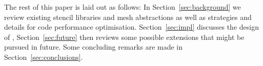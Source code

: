 The rest of this paper is laid out as follows:
In Section~\ref{sec:background} we review existing stencil libraries and mesh abstractions as well as strategies and details for code performance optimisation.
Section~\ref{sec:impl} discusses the design of , Section~\ref{sec:future} then reviews some possible extensions that might be pursued in future.
Some concluding remarks are made in Section~\ref{sec:conclusions}.
